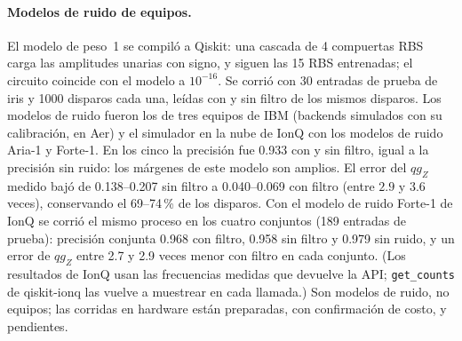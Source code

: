\documentclass[11pt]{article}
\newcommand{\qZ}{qg_Z}
\begin{document}
\paragraph{Modelos de ruido de equipos.} El modelo de peso~1 se compiló a Qiskit: una cascada de 4 compuertas
RBS carga las amplitudes unarias con signo, y siguen las 15 RBS entrenadas; el circuito coincide con el modelo a
$10^{-16}$. Se corrió con 30 entradas de prueba de iris y 1000 disparos cada una, leídas con y sin filtro de
los mismos disparos. Los modelos de ruido fueron los de tres equipos de IBM (backends simulados con su
calibración, en Aer) y el simulador en la nube de IonQ con los modelos de ruido Aria-1 y Forte-1. En los cinco
la precisión fue 0.933 con y sin filtro, igual a la precisión sin ruido: los márgenes de este modelo son
amplios. El error del $\qZ$ medido bajó de 0.138--0.207 sin filtro a 0.040--0.069 con filtro (entre $2.9$ y
$3.6$ veces), conservando el 69--74\,\% de los disparos. Con el modelo de ruido Forte-1 de IonQ se corrió el mismo proceso en los cuatro conjuntos (189 entradas de
prueba): precisión conjunta 0.968 con filtro, 0.958 sin filtro y 0.979 sin ruido, y un error de $\qZ$ entre 2.7 y
2.9 veces menor con filtro en cada conjunto. (Los resultados de IonQ usan las frecuencias medidas que devuelve
la API; \texttt{get\_counts} de qiskit-ionq las vuelve a muestrear en cada llamada.) Son modelos de ruido, no
equipos; las corridas en hardware están preparadas, con confirmación de costo, y pendientes.
\end{document}

